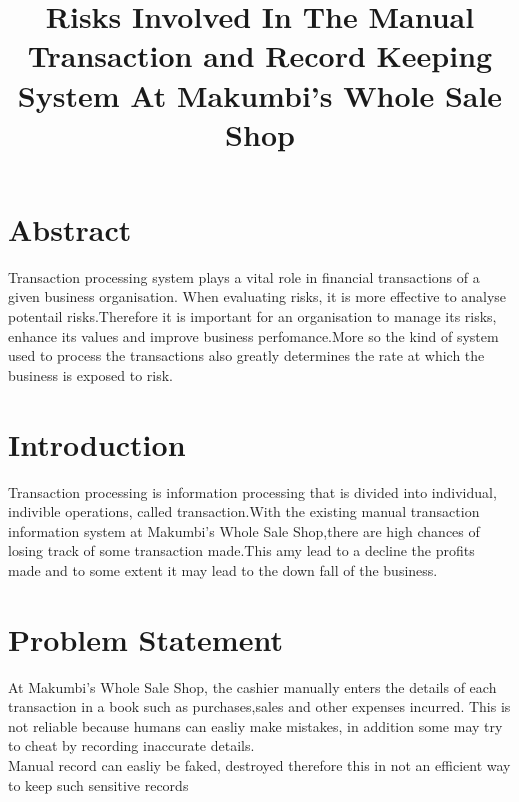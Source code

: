 \documentclass[12pt]{article}
\title{Risks Involved In The Manual Transaction and Record Keeping System At Makumbi's Whole Sale Shop}
\begin{document}
\maketitle
\section{Abstract}
Transaction processing system plays a vital role in financial transactions of a given business organisation. When evaluating risks, it is more effective to analyse potentail risks.Therefore it is important for an organisation to manage its risks, enhance its values and improve business perfomance.More so the kind of system used to process the transactions also greatly determines the rate at which the business is exposed to risk. 
\section{Introduction}
Transaction processing is information processing that is divided into individual, indivible operations, called transaction.With the existing manual transaction information system at Makumbi's Whole Sale Shop,there are high chances of losing track of some transaction made.This amy lead to a decline the profits made and to some extent it may lead to the down fall of the business. \\
\section{Problem Statement}
At Makumbi's Whole Sale Shop, the cashier manually enters the details of each transaction in a book such as purchases,sales and other expenses incurred. This is not reliable because humans can easliy make mistakes, in addition some may try to cheat by recording inaccurate details.\\
Manual record can easliy be faked, destroyed therefore this in not an efficient way to keep such sensitive records
\end{document}
